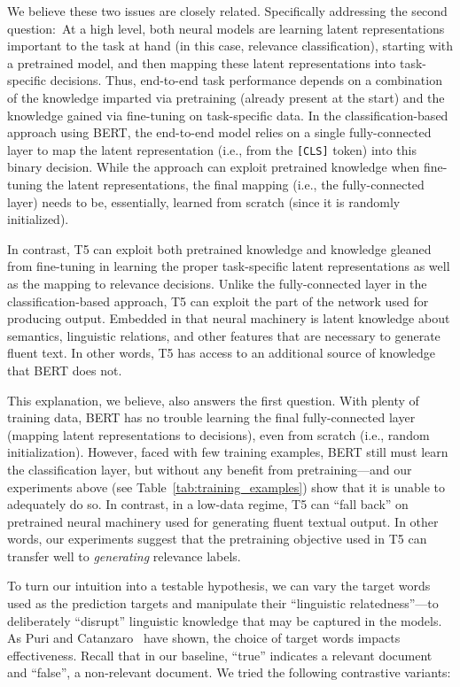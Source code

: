 \documentclass{article}
\begin{document}
We believe these two issues are closely related.
Specifically addressing the second question:\
At a high level, both neural models are learning latent representations important to the task at hand (in this case, relevance classification), starting with a pretrained model, and then mapping these latent representations into task-specific decisions.
Thus, end-to-end task performance depends on a combination of the knowledge imparted via pretraining (already present at the start) and the knowledge gained via fine-tuning on task-specific data.
In the classification-based approach using BERT, the end-to-end model relies on a single fully-connected layer to map the latent representation (i.e., from the \texttt{[CLS]} token) into this binary decision.
While the approach can exploit pretrained knowledge when fine-tuning the latent representations, the final mapping (i.e., the fully-connected layer) needs to be, essentially, learned from scratch (since it is randomly initialized).

In contrast, T5 can exploit both pretrained knowledge and knowledge gleaned from fine-tuning in learning the proper task-specific latent representations as well as the mapping to relevance decisions.
Unlike the fully-connected layer in the classification-based approach, T5 can exploit the part of the network used for producing output.
Embedded in that neural machinery is latent knowledge about semantics, linguistic relations, and other features that are necessary to generate fluent text.
In other words, T5 has access to an additional source of knowledge that BERT does not.

This explanation, we believe, also answers the first question.
With plenty of training data, BERT has no trouble learning the final fully-connected layer (mapping latent representations to decisions), even from scratch (i.e., random initialization).
However, faced with few training examples, BERT still must learn the classification layer, but without any benefit from pretraining---and our experiments above (see Table~\ref{tab:training_examples}) show that it is unable to adequately do so.
In contrast, in a low-data regime, T5 can ``fall back'' on pretrained neural machinery used for generating fluent textual output.
In other words, our experiments suggest that the pretraining objective used in T5 can transfer well to {\it generating} relevance labels.

To turn our intuition into a testable hypothesis, we can vary the target words used as the prediction targets and manipulate their ``linguistic relatedness''---to deliberately ``disrupt'' linguistic knowledge that may be captured in the models.
As Puri and Catanzaro~\cite{puri2019zero} have shown, the choice of target words impacts effectiveness.
Recall that in our baseline, ``true'' indicates a relevant document and ``false'', a non-relevant document.
We tried the following contrastive variants:
\end{document}
